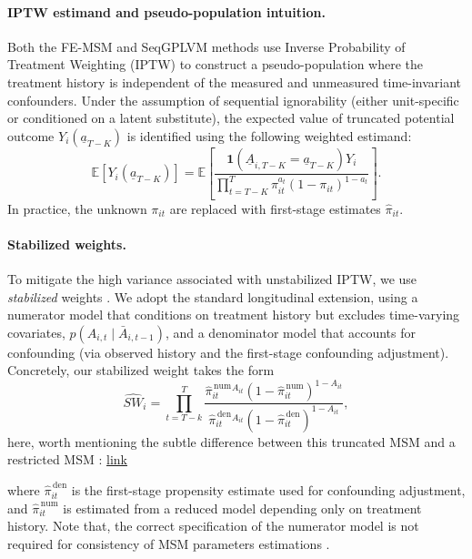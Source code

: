 \paragraph{IPTW estimand and pseudo-population intuition.}
Both the FE-MSM and SeqGPLVM methods use Inverse Probability of Treatment Weighting (IPTW) 
to construct a pseudo-population where the treatment history is independent of the measured and 
unmeasured time-invariant confounders. Under the assumption of sequential ignorability 
(either unit-specific or conditioned on a latent substitute), the expected value of truncated potential outcome 
$Y_i(\underline{a}_{T-K})$ is identified using the following weighted estimand:
$$\mathbb{E}[Y_i(\underline{a}_{T-K})] = \mathbb{E}\left[\frac{\mathbf{1}(\underline{A}_{i,T-K} = \underline{a}_{T-K})Y_i}{\prod_{t=T-K}^{T} \pi_{it}^{a_t}(1 - \pi_{it})^{1-a_t}}\right].$$
In practice, the unknown $\pi_{it}$ are replaced with first-stage estimates $\widehat{\pi}_{it}$. 


\paragraph{Stabilized weights.}
To mitigate the high variance associated with unstabilized IPTW, 
we use \emph{stabilized} weights \cite{robinsMarginalStructuralModels2000}.
We adopt the standard longitudinal extension, using a numerator model that 
conditions on treatment history but excludes time-varying covariates, $p(A_{i,t} \mid \bar{A}_{i,t-1})$, and a 
denominator model that accounts for confounding (via observed history and the 
first-stage confounding adjustment). Concretely, our stabilized weight takes the form
\[
\widehat{SW}_i
=
\prod_{t=T-k}^{T}
\frac{
\widehat{\pi}^{\,\text{num}}_{it}{}^{A_{it}}\left(1-\widehat{\pi}^{\,\text{num}}_{it}\right)^{1-A_{it}}
}{
\widehat{\pi}^{\,\text{den}}_{it}{}^{A_{it}}\left(1-\widehat{\pi}^{\,\text{den}}_{it}\right)^{1-A_{it}}
},
\]
here, worth mentioning the subtle difference between this truncated 
MSM and a restricted MSM : \hyperlink{https://chatgpt.com/share/69bac59f-ec30-8006-ae37-14e43945cf29}{link}

where $\widehat{\pi}^{\,\text{den}}_{it}$ is the first-stage propensity estimate used for confounding adjustment, and
$\widehat{\pi}^{\,\text{num}}_{it}$ is estimated from a reduced model depending only on treatment history. Note that, 
the correct specification of the numerator model is not required for consistency of MSM parameters estimations \cite{robinsMarginalStructuralModels2000}. 

